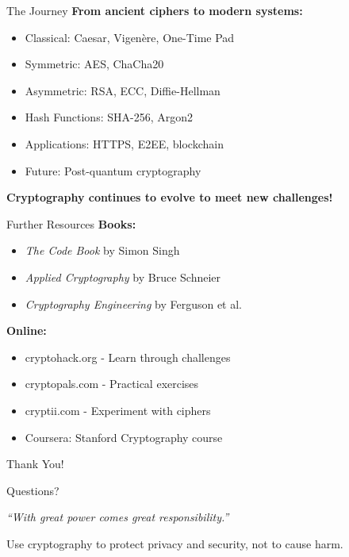 \documentclass{beamer}
\begin{document}
\begin{frame}{The Journey}
\textbf{From ancient ciphers to modern systems:}

\begin{itemize}
    \item Classical: Caesar, Vigenère, One-Time Pad
    \item Symmetric: AES, ChaCha20
    \item Asymmetric: RSA, ECC, Diffie-Hellman
    \item Hash Functions: SHA-256, Argon2
    \item Applications: HTTPS, E2EE, blockchain
    \item Future: Post-quantum cryptography
\end{itemize}

\vspace{0.5cm}
\textbf{Cryptography continues to evolve to meet new challenges!}
\end{frame}

\begin{frame}{Further Resources}
\textbf{Books:}
\begin{itemize}
    \item \emph{The Code Book} by Simon Singh
    \item \emph{Applied Cryptography} by Bruce Schneier
    \item \emph{Cryptography Engineering} by Ferguson et al.
\end{itemize}

\vspace{0.3cm}
\textbf{Online:}
\begin{itemize}
    \item cryptohack.org - Learn through challenges
    \item cryptopals.com - Practical exercises
    \item cryptii.com - Experiment with ciphers
    \item Coursera: Stanford Cryptography course
\end{itemize}
\end{frame}

\begin{frame}
\begin{center}
\Huge Thank You!

\vspace{1cm}
\large Questions?

\vspace{1cm}
\normalsize
\textit{``With great power comes great responsibility.''}

\vspace{0.5cm}
Use cryptography to protect privacy and security, not to cause harm.
\end{center}
\end{frame}
\end{document}
